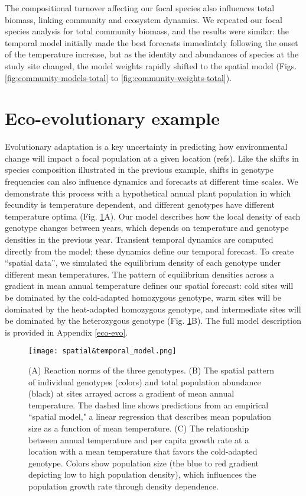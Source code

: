 \documentclass[11pt]{article}
\begin{document}
The compositional turnover affecting our focal species also influences total biomass, linking community and ecosystem dynamics. We repeated our focal species analysis 
for total community biomass, and the results were similar: the temporal model initially made the best forecasts immediately following the onset of the temperature
increase, but as the identity and abundances of species at the study site changed, the model weights rapidly shifted to the spatial model (Figs. \ref{fig:community-models-total} to \ref{fig:community-weights-total}). 

\section*{Eco-evolutionary example}

Evolutionary adaptation is a key uncertainty in predicting how environmental change will impact a focal population at a given location (refs). Like the shifts
in species composition illustrated in the previous example, shifts in genotype frequencies can also influence dynamics and forecasts at different time scales.
We demonstrate this process with a hypothetical annual plant population in which fecundity is temperature dependent, and different genotypes have different temperature optima (Fig. \ref{fig:evo_evo_spatial_temporal_models}A). Our model describes how the local density of each genotype changes between years,  which depends on temperature and genotype densities in the previous year. Transient temporal dynamics are computed directly from the model; these dynamics define our temporal forecast. To create ``spatial data'', we simulated the equilibrium density of each genotype under different mean temperatures. The pattern of equilibrium densities across a gradient in mean annual temperature defines our spatial forecast: cold sites will be dominated by the cold-adapted homozygous genotype, warm sites will be dominated by the heat-adapted homozygous genotype, and intermediate sites will be dominated by the heterozygous genotype (Fig. \ref{fig:evo_evo_spatial_temporal_models}B). The full model description is provided in Appendix \ref{eco-evo}. 

\begin{figure}[tbp]
\centering
\texttt{[image: spatial\&temporal\_model.png]}
\caption{(A) Reaction norms of the three genotypes. (B) The spatial pattern of individual genotypes (colors) and total population abundance (black) at sites arrayed across a gradient of mean annual temperature. The dashed line shows predictions from an empirical ``spatial model," a linear regression that describes mean population size as a function of mean temperature. (C) The relationship between annual temperature and per capita growth rate at a location with a mean temperature that favors the cold-adapted genotype. Colors show population size (the blue to red gradient depicting low to high population density), which influences the population growth rate through density dependence. }
\label{fig:evo_evo_spatial_temporal_models}
\end{figure}
\end{document}
